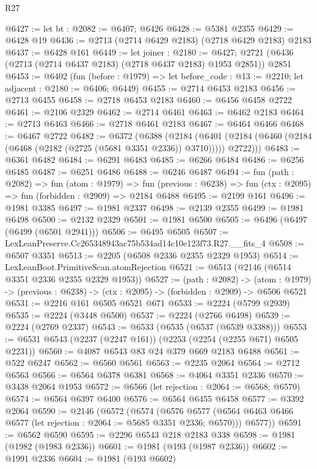 \begin{lexlean}{R27}
\begin{coremodule}
@6427 := let bt : @2082 := @6407; @6426
@6428 := @5381 @2355
@6429 := @6428 @19
@6436 := @2713 (@2714 @6429 @2183) (@2718 @6429 @2183) @2183
@6437 := @6428 @161
@6449 := let joiner : @2180 := @6427;
  @2721 (@6436 (@2713 (@2714 @6437 @2183) (@2718 @6437 @2183) @1953 @2851)) @2851
@6453 := @6402
    (fun (before : @1979) => let before_code : @13 := @2210; let adjacent : @2180 := @6406; @6449)
@6455 := @2714 @6453 @2183
@6456 := @2713 @6455
@6458 := @2718 @6453 @2183
@6460 := @6456 @6458 @2722
@6461 := @2106 @2329
@6462 := @2714 @6461
@6463 := @6462 @2183
@6464 := @2713 @6463
@6466 := @2718 @6461 @2183
@6467 := @6464 @6466
@6468 := @6467 @2722
@6482 := @6372
    (@6388
      (@2184
        (@6401 (@2184 (@6460 (@2184 (@6468 (@2182 (@2725 (@5681 @3351 @2336)) @3710))))) @2722)))
@6483 := @6361 @6482
@6484 := @6291 @6483
@6485 := @6266 @6484
@6486 := @6256 @6485
@6487 := @6251 @6486
@6488 := @6246 @6487
@6494 := fun (path : @2082) =>
  fun (atom : @1979) =>
  fun (previous : @6238) => fun (ctx : @2095) => fun (forbidden : @2909) => @2184 @6488
@6495 := @2199 @161
@6496 := @1981 @3385
@6497 := @1981 @2337
@6498 := @2139 @2355
@6499 := @1981 @6498
@6500 := @2132 @2329
@6501 := @1981 @6500
@6505 := @6496 (@6497 (@6499 (@6501 @2941)))
@6506 := @6495 @6505
@6507 := LexLeanPreserve.Cc265348943ac75b534ad14c10e123f73.R27.__fits_4
@6508 := @6507 @3351
@6513 := @2205 (@6508 @2336 @2355 @2329 @1953)
@6514 := LexLeanBoot.PrimitiveScan.atomRejection
@6521 := @6513 (@2146 (@6514 @3351 @2336 @2355 @2329 @1953))
@6527 := (path : @2082) ->
  (atom : @1979) -> (previous : @6238) -> (ctx : @2095) -> (forbidden : @2909) -> @6506 @6521
@6531 := @2216 @161 @6505 @6521 @671
@6533 := @2224 (@5799 @2939)
@6535 := @2224 (@3448 @6500)
@6537 := @2224 (@2766 @6498)
@6539 := @2224 (@2769 @2337)
@6543 := @6533 (@6535 (@6537 (@6539 @3388)))
@6553 := @6531 @6543 (@2237 (@2247 @161)) (@2253 (@2254 (@2255 @671) @6505 @2231))
@6560 := @4087 @6543 @83 @24 @379 @669 @2183 @6488
@6561 := @522 @6247
@6562 := @6560 @6561
@6563 := @2235 @2064
@6564 := @2712 @6563
@6566 := @6564 @6378 @6381
@6568 := @4064 @3351 @2336
@6570 := @3438 @2064 @1953
@6572 := @6566 (let rejection : @2064 := @6568; @6570)
@6574 := @6564 @6397 @6400
@6576 := @6564 @6455 @6458
@6577 := @3392 @2064
@6590 := @2146
    (@6572
      (@6574
        (@6576 @6577 (@6564 @6463 @6466 @6577 (let rejection : @2064 := @5685 @3351 @2336; @6570)))
        @6577))
@6591 := @6562 @6590
@6595 := @2296 @6543 @218 @2183 @338
@6598 := @1981 (@1982 (@1983 @2336))
@6601 := @1981 (@193 (@1987 @2336))
@6602 := @1991 @2336
@6604 := @1981 (@193 @6602)

\end{coremodule}
\end{lexlean}
